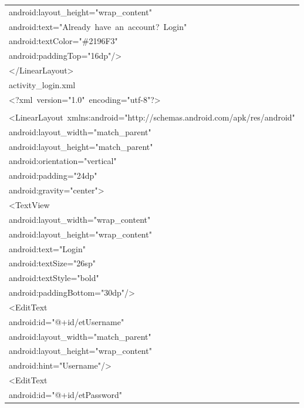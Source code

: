 \documentclass[a4paper,12pt]{article}
\begin{document}
\begin{longtable}{|p{}|}
{\ttfamily\small android:layout\_height="wrap\_content"} \\
{\ttfamily\small android:text="Already\ have\ an\ account?\ Login"} \\
{\ttfamily\small android:textColor="\#2196F3"} \\
{\ttfamily\small android:paddingTop="16dp"/\textgreater{}} \\
{\ttfamily\small \textless{}/LinearLayout\textgreater{}} \\
{\ttfamily\small activity\_login.xml} \\
{\ttfamily\small \textless{}?xml\ version="1.0"\ encoding="utf-8"?\textgreater{}} \\
\strut \\
{\ttfamily\small \textless{}LinearLayout\ xmlns:android="http://schemas.android.com/apk/res/android"} \\
{\ttfamily\small android:layout\_width="match\_parent"} \\
{\ttfamily\small android:layout\_height="match\_parent"} \\
{\ttfamily\small android:orientation="vertical"} \\
{\ttfamily\small android:padding="24dp"} \\
{\ttfamily\small android:gravity="center"\textgreater{}} \\
{\ttfamily\small \textless{}TextView} \\
{\ttfamily\small android:layout\_width="wrap\_content"} \\
{\ttfamily\small android:layout\_height="wrap\_content"} \\
{\ttfamily\small android:text="Login"} \\
{\ttfamily\small android:textSize="26sp"} \\
{\ttfamily\small android:textStyle="bold"} \\
{\ttfamily\small android:paddingBottom="30dp"/\textgreater{}} \\
{\ttfamily\small \textless{}EditText} \\
{\ttfamily\small android:id="@+id/etUsername"} \\
{\ttfamily\small android:layout\_width="match\_parent"} \\
{\ttfamily\small android:layout\_height="wrap\_content"} \\
{\ttfamily\small android:hint="Username"/\textgreater{}} \\
{\ttfamily\small \textless{}EditText} \\
{\ttfamily\small android:id="@+id/etPassword"} \\

\end{longtable}
\end{document}
